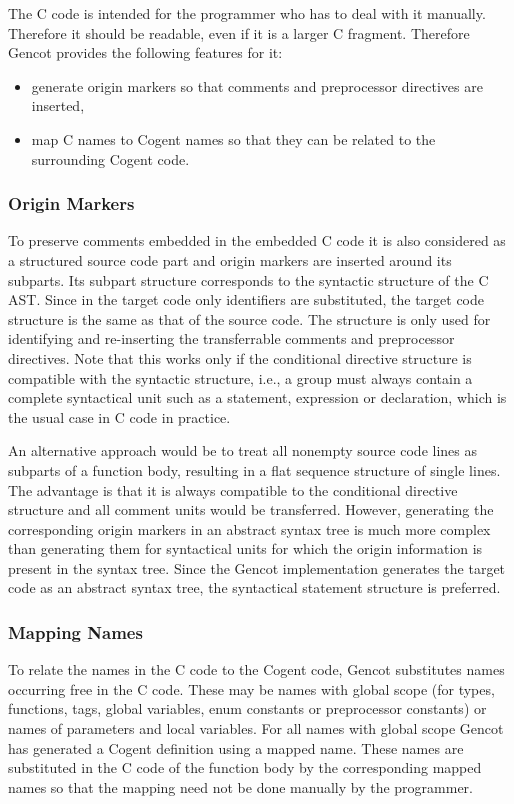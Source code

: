 The C code is intended for the programmer who has to deal with it manually. Therefore it should
be readable, even if it is a larger C fragment. Therefore Gencot provides the following features for it:
\begin{itemize}
\item generate origin markers so that comments and preprocessor directives are inserted,
\item map C names to Cogent names so that they can be related to the surrounding Cogent code.
\end{itemize}

\subsubsection{Origin Markers}

To preserve comments embedded in the embedded C code it is also considered as a structured source code part
and origin markers are inserted around its subparts. Its 
subpart structure corresponds to the syntactic structure of the C AST. Since in the target code only identifiers 
are substituted, the target code
structure is the same as that of the source code. The structure is only used for identifying and re-inserting
the transferrable comments and preprocessor directives. Note that this works only if the conditional directive 
structure is compatible with the syntactic structure, i.e., a group must always contain a complete syntactical
unit such as a statement, expression or declaration, which is the usual case in C code in practice.

An alternative approach would be to treat all nonempty source code lines as subparts of a function body, resulting
in a flat sequence structure of single lines. The advantage is that it is always compatible to the conditional 
directive structure and
all comment units would be transferred. However, generating the corresponding origin markers in an abstract syntax
tree is much more complex than generating them for syntactical units for which the origin information is present
in the syntax tree. Since the Gencot implementation generates the
target code as an abstract syntax tree, the syntactical statement structure is preferred. 

\subsubsection{Mapping Names}

To relate the names in the C code to the Cogent code, Gencot substitutes names occurring free in the C code. These may
be names with global scope (for types, functions, tags, global variables, enum constants or preprocessor constants)
or names of parameters and local variables. For all names with global scope Gencot has generated a Cogent definition using a mapped name.
These names are substituted in the C code of the function body by the corresponding mapped names so that the 
mapping need not be done manually by the programmer.

